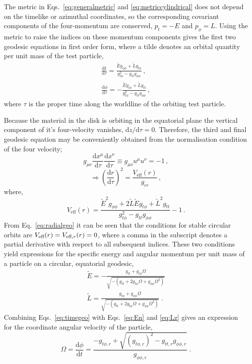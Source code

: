 The metric in Eqs.\ \ref{eq:generalmetric} and \ref{eq:metriccylindrical} does not depend on the timelike or azimuthal coordinates, so the corresponding covariant components of the four-momentum are conserved, $p_{t}=-E$ and $p_{\phi}=L$. Using the metric to raise the indices on these momentum components gives the first two geodesic equations in first order form, where a tilde denotes an orbital quantity per unit mass of the test particle,
\begin{eqnarray}\label{eq:timegeo} 
\frac{\textrm{d}t}{\textrm{d}\tau} 	=\frac{\tilde{E}g_{\phi \phi}+\tilde{L}g_{t \phi}}{g_{t \phi}^{2}-g_{tt}g_{\phi \phi}}\, , \nonumber \\ 
\frac{\textrm{d}\phi}{\textrm{d}\tau} 	=-\frac{\tilde{E}g_{t\phi}+\tilde{L}g_{tt}}{g_{t \phi}^{2}-g_{tt}g_{\phi \phi}}\, ,
\end{eqnarray}
where $\tau$ is the proper time along the worldline of the orbiting test particle.

Because the material in the disk is orbiting in the equatorial plane the vertical component of it's four-velocity vanishes, $\textrm{d}z/\textrm{d}\tau=0$. Therefore, the third and final geodesic equation may be conveniently obtained from the normalisation condition of the four velocity;
\begin{equation}
\label{eq:norm4velocity}g_{\mu\nu}\frac{\textrm{d}x^{\mu}}{\textrm{d}\tau}\frac{\textrm{d}x^{\nu}}{\textrm{d}\tau}\equiv g_{\mu\nu}u^{\mu}u^{\nu}=-1 \, , 
\end{equation}
\begin{equation}
\label{eq:radialgeo}\Rightarrow \left(\frac{\textrm{d}r}{\textrm{d}\tau}\right)^{2} = \frac{V_{\textrm{eff}}(r)}{g_{rr}} \, , 
\end{equation}
where,
\begin{equation} V_{\textrm{eff}}(r)= \frac{\tilde{E}^{2}g_{\phi \phi}+2\tilde{L}\tilde{E}g_{t\phi}+\tilde{L}^{2}g_{tt}}{g_{t\phi}^{2}-g_{tt}g_{\phi\phi}}-1 \, . \end{equation} 
From Eq.\ \ref{eq:radialgeo} it can be seen that the conditions for stable circular orbits are $V_{\textrm{eff}}(r)\nobreak=\nobreak V_{\textrm{eff},r}(r)\nobreak=\nobreak0$, where a comma in the subscript denotes a partial derivative with respect to all subsequent indices. These two conditions yield expressions for the specific energy and angular momentum per unit mass of a particle on a circular, equatorial geodesic,
\begin{eqnarray} 
\tilde{E} = -\frac{g_{tt}+g_{t\phi}\Omega}{\sqrt{-\left( g_{tt}+2g_{t\phi}\Omega+g_{\phi\phi}\Omega^{2} \right)}} \label{eq:En} \\
\tilde{L} = \frac{g_{t\phi}+g_{\phi\phi}\Omega}{\sqrt{-\left( g_{tt}+2g_{t\phi}\Omega+g_{\phi\phi}\Omega^{2} \right)}}\; . \label{eq:Lz}
\end{eqnarray}
Combining Eqs.\ \ref{eq:timegeo} with Eqs.\ \ref{eq:En} and \ref{eq:Lz} gives an expression for the coordinate angular velocity of the particle,
\begin{equation}\label{eq:omega} \Omega = \frac{\textrm{d}\phi}{\textrm{d}t} = \frac{-g_{t\phi ,r}+\sqrt{ \left( g_{t\phi,r} \right)^{2} - g_{tt,r} g_{\phi\phi ,r} }}{g_{\phi \phi , r}} \; . \end{equation}

